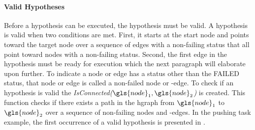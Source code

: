 
\paragraph{Valid Hypotheses}
Before a hypothesis can be executed, the hypothesis must be valid. A hypothesis is valid when two conditions are met. First, it starts at the start node and points toward the target node over a sequence of edges with a non-failing status that all point toward nodes with a non-failing status. Second, the first edge in the hypothesis must be ready for execution which the next paragraph will elaborate upon further. To indicate a node or edge has a status other than the FAILED status, that node or edge is called a non-failed node or -edge. To check if an hypothesis is valid the \textit{IsConnected($\gls{node}_1, \gls{node}_2$)} is created. This function checks if there exists a path in the \ac{hgraph} from $\gls{node}_1$ to $\gls{node}_2$ over a sequence of non-failing nodes and -edges. In the pushing task example, the first occurrence of a valid hypothesis is presented in .\bs

